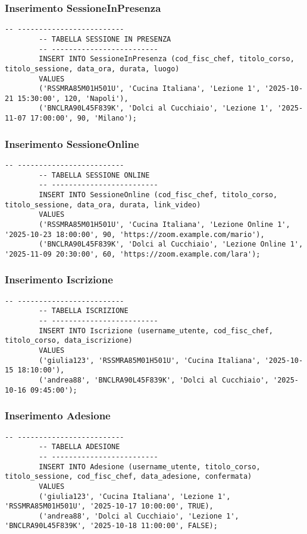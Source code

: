 \documentclass[a4paper, 12pt]{article}
\begin{document}
        \subsubsection{Inserimento SessioneInPresenza}
        \begin{lstlisting}[style=sqlstyle]
        -- -------------------------
        -- TABELLA SESSIONE IN PRESENZA
        -- -------------------------
        INSERT INTO SessioneInPresenza (cod_fisc_chef, titolo_corso, titolo_sessione, data_ora, durata, luogo)
        VALUES
        ('RSSMRA85M01H501U', 'Cucina Italiana', 'Lezione 1', '2025-10-21 15:30:00', 120, 'Napoli'),
        ('BNCLRA90L45F839K', 'Dolci al Cucchiaio', 'Lezione 1', '2025-11-07 17:00:00', 90, 'Milano');
        \end{lstlisting}
        \subsubsection{Inserimento SessioneOnline}
        \begin{lstlisting}[style=sqlstyle]
        -- -------------------------
        -- TABELLA SESSIONE ONLINE
        -- -------------------------
        INSERT INTO SessioneOnline (cod_fisc_chef, titolo_corso, titolo_sessione, data_ora, durata, link_video)
        VALUES
        ('RSSMRA85M01H501U', 'Cucina Italiana', 'Lezione Online 1', '2025-10-23 18:00:00', 90, 'https://zoom.example.com/mario'),
        ('BNCLRA90L45F839K', 'Dolci al Cucchiaio', 'Lezione Online 1', '2025-11-09 20:30:00', 60, 'https://zoom.example.com/lara');
        \end{lstlisting}
        \newpage
        \subsubsection{Inserimento Iscrizione}
        \begin{lstlisting}[style=sqlstyle]
        -- -------------------------
        -- TABELLA ISCRIZIONE
        -- -------------------------
        INSERT INTO Iscrizione (username_utente, cod_fisc_chef, titolo_corso, data_iscrizione)
        VALUES
        ('giulia123', 'RSSMRA85M01H501U', 'Cucina Italiana', '2025-10-15 18:10:00'),
        ('andrea88', 'BNCLRA90L45F839K', 'Dolci al Cucchiaio', '2025-10-16 09:45:00');
        \end{lstlisting}
        \subsubsection{Inserimento Adesione}
        \begin{lstlisting}[style=sqlstyle]
        -- -------------------------
        -- TABELLA ADESIONE
        -- -------------------------
        INSERT INTO Adesione (username_utente, titolo_corso, titolo_sessione, cod_fisc_chef, data_adesione, confermata)
        VALUES
        ('giulia123', 'Cucina Italiana', 'Lezione 1', 'RSSMRA85M01H501U', '2025-10-17 10:00:00', TRUE),
        ('andrea88', 'Dolci al Cucchiaio', 'Lezione 1', 'BNCLRA90L45F839K', '2025-10-18 11:00:00', FALSE);
        \end{lstlisting}
\end{document}

